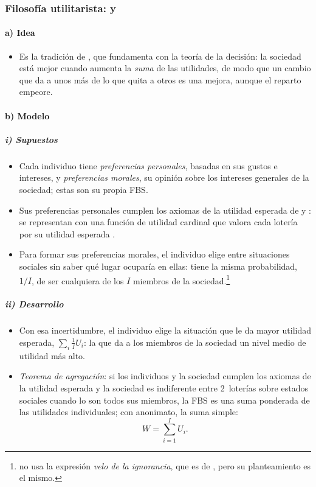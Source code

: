 \documentclass[11pt]{article}
\begin{document}
\subsubsection{Filosofía utilitarista:  y }\label{sec:utilitarismo}

\paragraph{a) Idea}

\begin{itemize}
\item Es la tradición de , que  fundamenta con la teoría de la decisión: la sociedad está mejor cuando aumenta la \emph{suma} de las utilidades, de modo que un cambio que da a unos más de lo que quita a otros es una mejora, aunque el reparto empeore.
\end{itemize}

\paragraph{b) Modelo}

\subparagraph{i) Supuestos}

\begin{itemize}
\item Cada individuo tiene \emph{preferencias personales}, basadas en sus gustos e intereses, y \emph{preferencias morales}, su opinión sobre los intereses generales de la sociedad; estas son su propia FBS.
\item Sus preferencias personales cumplen los axiomas de la utilidad esperada de  y : se representan con una función de utilidad cardinal que valora cada lotería por su utilidad esperada .
\item Para formar sus preferencias morales, el individuo elige entre situaciones sociales sin saber qué lugar ocuparía en ellas: tiene la misma probabilidad, $1/I$, de ser cualquiera de los $I$ miembros de la sociedad\nocite{Harsanyi1953Cardinal}.\footnote{ no usa la expresión \emph{velo de la ignorancia}, que es de , pero su planteamiento es el mismo.}
\end{itemize}

\subparagraph{ii) Desarrollo}

\begin{itemize}
\item Con esa incertidumbre, el individuo elige la situación que le da mayor utilidad esperada, $\sum_i\frac{1}{I}U_i$: la que da a los miembros de la sociedad un nivel medio de utilidad más alto.
\item \emph{Teorema de agregación}\nocite{Harsanyi1955Cardinal}: si los individuos y la sociedad cumplen los axiomas de la utilidad esperada y la sociedad es indiferente entre 2~loterías sobre estados sociales cuando lo son todos sus miembros, la FBS es una suma ponderada de las utilidades individuales; con anonimato, la suma simple:
  $$W=\sum_{i=1}^{I}U_i.$$
\end{itemize}
\end{document}
